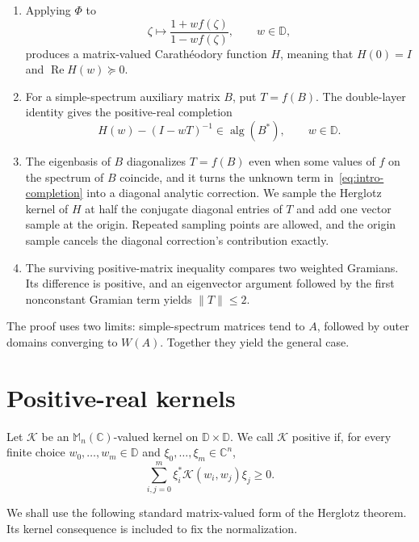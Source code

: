 \documentclass[preprints,article,submit,oneauthor]{Definitions/mdpi}
\theoremstyle{mdpi}
\theoremstyle{definition}
\newcommand{\C}{\mathbb C}
\newcommand{\D}{\mathbb D}
\newcommand{\Mn}{\mathbb M_n(\C)}
\newcommand{\alg}{\operatorname{alg}}
\newcommand{\RePart}{\operatorname{Re}}
\begin{document}
\begin{enumerate}
\item Applying $\Phi$ to
\[
  \zeta\longmapsto\frac{1+w f(\zeta)}{1-w f(\zeta)},
  \qquad w\in\D,
\]
produces a matrix-valued Carath\'eodory function $H$, meaning that
$H(0)=I$ and $\RePart H(w)\succeq0$.

\item For a simple-spectrum auxiliary matrix $B$, put $T=f(B)$.  The
double-layer identity gives the positive-real completion
\begin{equation}
  H(w)-(I-wT)^{-1}\in\alg(B^*),\qquad w\in\D.
  \label{eq:intro-completion}
\end{equation}

\item The eigenbasis of $B$ diagonalizes $T=f(B)$ even when some values
of $f$ on the spectrum of $B$ coincide, and it turns the unknown term
in~\eqref{eq:intro-completion} into a diagonal analytic correction.  We
sample the Herglotz kernel of $H$ at half the conjugate diagonal entries
of $T$ and add one vector sample at the origin.  Repeated sampling
points are allowed, and the origin sample cancels the diagonal
correction's contribution exactly.

\item The surviving positive-matrix inequality compares two weighted
Gramians.  Its difference is positive, and an eigenvector argument
followed by the first nonconstant Gramian term yields
$\lVert T\rVert\leq2$.
\end{enumerate}

The proof uses two limits: simple-spectrum matrices tend to $A$,
followed by outer domains converging to $W(A)$.  Together they yield
the general case.

\section{Positive-real kernels}
\label{sec:herglotz}

Let $\mathcal K$ be an $\Mn$-valued kernel on $\D\times\D$.  We call
$\mathcal K$ positive if, for every finite choice
$w_0,\ldots,w_m\in\D$ and $\xi_0,\ldots,\xi_m\in\C^n$,
\begin{equation}
  \sum_{i,j=0}^m
  \xi_i^*\mathcal K(w_i,w_j)\xi_j\geq0.
  \label{eq:positive-kernel-definition}
\end{equation}

We shall use the following standard matrix-valued form of the Herglotz
theorem.  Its kernel consequence is included to fix the normalization.
\end{document}
